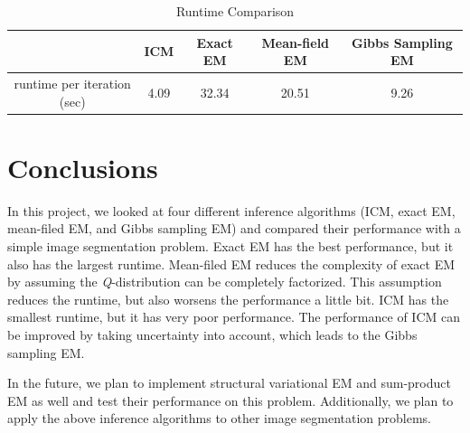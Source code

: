 \documentclass{article} %
\begin{document}
\begin{table}[h]
\centering
\caption{Runtime Comparison}
\label{tab:runtime}
\begin{tabular}{|c|c|c|c|c|}
\hline
& ICM & Exact EM & Mean-field EM & Gibbs Sampling EM \\ \hline
runtime per iteration (sec) & 4.09 & 32.34 & 20.51 & 9.26 \\ \hline
\end{tabular}
\end{table}

\section{Conclusions}
\label{conclusion}
In this project, we looked at four different inference algorithms (ICM, exact EM, mean-filed EM, and Gibbs sampling EM) and compared their performance with a simple image segmentation problem. Exact EM has the best performance, but it also has the largest runtime. Mean-filed EM reduces the complexity of exact EM by assuming the \textit{Q}-distribution can be completely factorized. This assumption reduces the runtime, but also worsens the performance a little bit. ICM has the smallest runtime, but it has very poor performance. The performance of ICM can be improved by taking uncertainty into account, which leads to the Gibbs sampling EM.

In the future, we plan to implement structural variational EM and sum-product EM as well and test their performance on this problem. Additionally, we plan to apply the above inference algorithms to other image segmentation problems.
\end{document}
